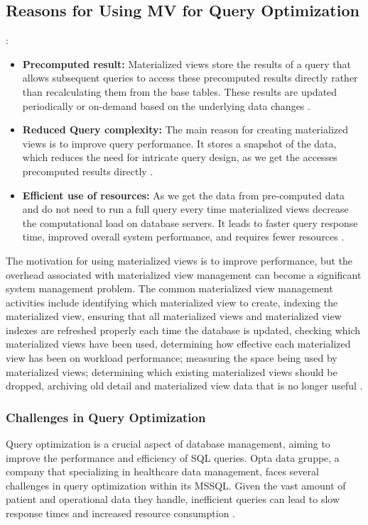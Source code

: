  \subsection{Reasons for Using MV for Query Optimization}:
\begin{itemize}
    \item\textbf{Precomputed result:} Materialized views store the results of a query that allows subsequent queries to access these precomputed results directly rather than recalculating them from the base tables. These results are updated periodically or on-demand based on the underlying data changes \cite{khan-2023,Risingwave-no-date}.
    \item\textbf{Reduced Query complexity:} The main reason for creating materialized views is to improve query performance. It stores a snapshot of the data, which reduces the need for intricate query design, as we get the accesses precomputed results directly \cite{Risingwave-no-date,Databricks-no-date}.
    \item\textbf{Efficient use of resources:} As we get the data from pre-computed data and do not need to run a full query every time materialized views decrease the computational load on database servers. It leads to faster query response time, improved overall system performance, and requires fewer resources \cite{google-no-date, khan-2023}.
    
\end{itemize}\vspace{.4cm}

The motivation for using materialized views is to improve performance, but the overhead associated with materialized view management can become a significant system management problem. The common materialized view management activities include identifying which materialized view to create, indexing the materialized view, ensuring that all materialized views and materialized view indexes are refreshed properly each time the database is updated, checking which materialized views have been used, determining how effective each materialized view has been on workload performance; measuring the space being used by materialized views; determining which existing materialized views should be dropped,  archiving old detail and materialized view data that is no longer useful \cite{Ashadevi2008CostEA,1363763}.

\subsubsection{Challenges in Query Optimization} Query optimization is a crucial aspect of database management, aiming to improve the performance and efficiency of SQL queries. Opta data gruppe, a company that specializing in healthcare data management, faces several challenges in query optimization within its MSSQL. Given the vast amount of patient and operational data they handle, inefficient queries can lead to slow response times and increased resource consumption \cite{Flipico-2024}.\vspace{.4cm} 

